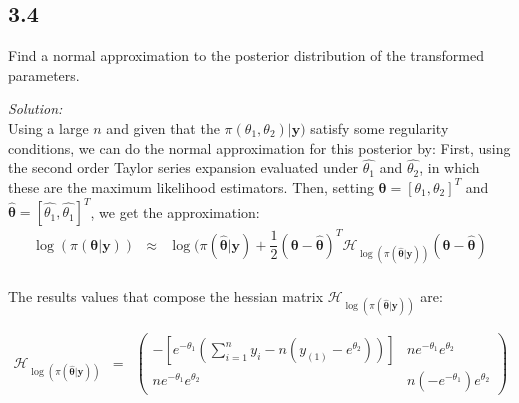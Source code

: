 \documentclass[a4paper, 11pt]{article}
\begin{document}
\subsection*{3.4} Find a normal approximation to the posterior distribution of the transformed parameters.

\noindent
\textit{Solution:}\\

Using a large $n$ and given that the $\pi(\theta_1,\theta_2)|\textbf{y})$ satisfy some regularity conditions, we can do the normal approximation for this posterior by: First, using the second order Taylor series expansion evaluated under $\hat{\theta_1}$ and $\hat{\theta_2}$, in which these are the maximum likelihood estimators. Then, setting $\boldsymbol{\theta} = [\theta_1, \theta_2]^T$ and $\boldsymbol{\hat{\theta}} = [\hat{\theta_1}, \hat{\theta_1}]^T$, we get the approximation:
\begin{equation}
\begin{array}{lclll}
\log(\pi(\boldsymbol{\theta}|\textbf{y})) & \approx &  \log(\pi(\boldsymbol{\hat{\theta}}|\textbf{y}) + \dfrac{1}{2} (\boldsymbol{\theta} - \boldsymbol{\hat{\theta}})^T \mathcal{H}_{ \log(\pi(\boldsymbol{\hat{\theta}}|\textbf{y}))}(\boldsymbol{\theta} - \boldsymbol{\hat{\theta}})\\
\end{array} 
\label{eq1}
\end{equation}

The results values that compose the hessian matrix $\mathcal{H}_{ \log(\pi(\boldsymbol{\hat{\theta}}|\textbf{y}))}$ are:

\begin{equation*}
\begin{array}{rclll}
\mathcal{H}_{ \log(\pi(\boldsymbol{\hat{\theta}}|\textbf{y}))} & = & \left(
    \begin{array}{cc}
     - \left[e^{-\theta_1} \left( \displaystyle\sum_{i=1}^{n}y_i - n(y_{(1)} - e^{\theta_2})  \right)\right]  & n e^{-\theta_1}e^{\theta_2}\\
      n e^{-\theta_1}e^{\theta_2} &  n(-e^{-\theta_1})e^{\theta_2}
    \end{array}
        \right)
\end{array}
\end{equation*}
\end{document}
